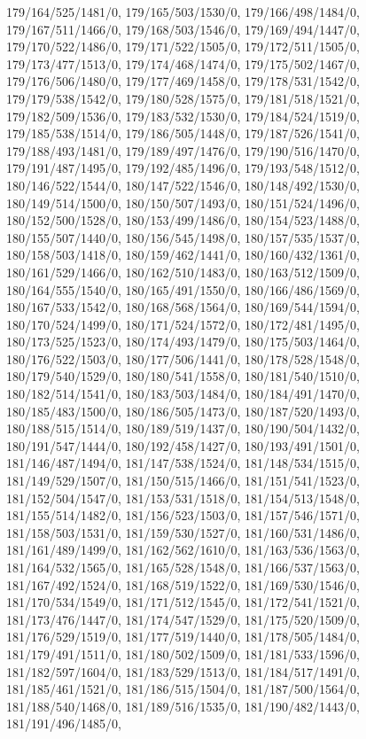 {179/164/525/1481/0,%
179/165/503/1530/0,%
179/166/498/1484/0,%
179/167/511/1466/0,%
179/168/503/1546/0,%
179/169/494/1447/0,%
179/170/522/1486/0,%
179/171/522/1505/0,%
179/172/511/1505/0,%
179/173/477/1513/0,%
179/174/468/1474/0,%
179/175/502/1467/0,%
179/176/506/1480/0,%
179/177/469/1458/0,%
179/178/531/1542/0,%
179/179/538/1542/0,%
179/180/528/1575/0,%
179/181/518/1521/0,%
179/182/509/1536/0,%
179/183/532/1530/0,%
179/184/524/1519/0,%
179/185/538/1514/0,%
179/186/505/1448/0,%
179/187/526/1541/0,%
179/188/493/1481/0,%
179/189/497/1476/0,%
179/190/516/1470/0,%
179/191/487/1495/0,%
179/192/485/1496/0,%
179/193/548/1512/0,%
180/146/522/1544/0,%
180/147/522/1546/0,%
180/148/492/1530/0,%
180/149/514/1500/0,%
180/150/507/1493/0,%
180/151/524/1496/0,%
180/152/500/1528/0,%
180/153/499/1486/0,%
180/154/523/1488/0,%
180/155/507/1440/0,%
180/156/545/1498/0,%
180/157/535/1537/0,%
180/158/503/1418/0,%
180/159/462/1441/0,%
180/160/432/1361/0,%
180/161/529/1466/0,%
180/162/510/1483/0,%
180/163/512/1509/0,%
180/164/555/1540/0,%
180/165/491/1550/0,%
180/166/486/1569/0,%
180/167/533/1542/0,%
180/168/568/1564/0,%
180/169/544/1594/0,%
180/170/524/1499/0,%
180/171/524/1572/0,%
180/172/481/1495/0,%
180/173/525/1523/0,%
180/174/493/1479/0,%
180/175/503/1464/0,%
180/176/522/1503/0,%
180/177/506/1441/0,%
180/178/528/1548/0,%
180/179/540/1529/0,%
180/180/541/1558/0,%
180/181/540/1510/0,%
180/182/514/1541/0,%
180/183/503/1484/0,%
180/184/491/1470/0,%
180/185/483/1500/0,%
180/186/505/1473/0,%
180/187/520/1493/0,%
180/188/515/1514/0,%
180/189/519/1437/0,%
180/190/504/1432/0,%
180/191/547/1444/0,%
180/192/458/1427/0,%
180/193/491/1501/0,%
181/146/487/1494/0,%
181/147/538/1524/0,%
181/148/534/1515/0,%
181/149/529/1507/0,%
181/150/515/1466/0,%
181/151/541/1523/0,%
181/152/504/1547/0,%
181/153/531/1518/0,%
181/154/513/1548/0,%
181/155/514/1482/0,%
181/156/523/1503/0,%
181/157/546/1571/0,%
181/158/503/1531/0,%
181/159/530/1527/0,%
181/160/531/1486/0,%
181/161/489/1499/0,%
181/162/562/1610/0,%
181/163/536/1563/0,%
181/164/532/1565/0,%
181/165/528/1548/0,%
181/166/537/1563/0,%
181/167/492/1524/0,%
181/168/519/1522/0,%
181/169/530/1546/0,%
181/170/534/1549/0,%
181/171/512/1545/0,%
181/172/541/1521/0,%
181/173/476/1447/0,%
181/174/547/1529/0,%
181/175/520/1509/0,%
181/176/529/1519/0,%
181/177/519/1440/0,%
181/178/505/1484/0,%
181/179/491/1511/0,%
181/180/502/1509/0,%
181/181/533/1596/0,%
181/182/597/1604/0,%
181/183/529/1513/0,%
181/184/517/1491/0,%
181/185/461/1521/0,%
181/186/515/1504/0,%
181/187/500/1564/0,%
181/188/540/1468/0,%
181/189/516/1535/0,%
181/190/482/1443/0,%
181/191/496/1485/0,%
}

